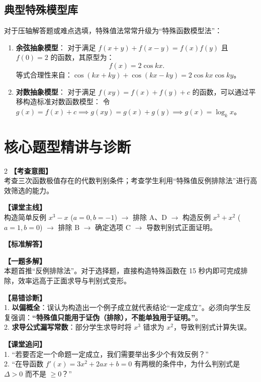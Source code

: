\documentclass[11pt,a4paper]{ctexart}
\begin{document}
\subsection{典型特殊模型库}
对于压轴解答题或难点选填，特殊值法常常升级为“特殊函数模型法”：
\begin{enumerate}[label=\arabic*. , leftmargin=2em, itemsep=1.2em, topsep=0.2em]
  \item \textbf{余弦抽象模型}：
  对于满足 \(f(x+y)+f(x-y)=f(x)f(y)\) 且 \(f(0)=2\) 的函数，其原型为：
  \[
  f(x) = 2\cos kx.
  \]
  等式合理性来自：\(\cos(kx+ky) + \cos(kx-ky) = 2\cos kx \cos ky\)。
  \item \textbf{对数抽象模型}：
  对于满足 \(f(xy) = f(x) + f(y) + c\) 的函数，可以通过平移构造标准对数函数模型：
  令 \(g(x) = f(x) + c \implies g(xy) = g(x) + g(y) \implies g(x) = \log_k x\)。
\end{enumerate}

\newpage

\section{核心题型精讲与诊断}

\qOneStem
\qOneOptions

\begin{paracol}{2}
  \textbf{【考查意图】}\\
  考查三次函数极值存在的代数判别条件；考查学生利用“特殊值反例排除法”进行高效筛选的能力。
  
  \textbf{【课堂主线】}\\
  构造简单反例 \(x^3-x\) (\(a=0,b=-1\)) \(\to\) 排除 A、D \(\to\) 构造反例 \(x^3+x^2\) (\(a=1,b=0\)) \(\to\) 排除 B \(\to\) 确定选项 C \(\to\) 导数判别式正面证明。
  
  \textbf{【标准解答】}\\
  \qOneSolution
  
  \textbf{【一题多解】}\\
  本题首推“反例排除法”。对于选择题，直接构造特殊函数在 15 秒内即可完成排除，效率远高于正面求导与判别式变形。

  \switchcolumn
  \textbf{【易错诊断】}\\
  1. \textbf{以偏概全}：误认为构造出一个例子成立就代表结论“一定成立”。必须向学生反复强调：\textbf{“特殊值只能用于证伪（排除），不能单独用于证明。”}。\\
  2. \textbf{求导公式漏写常数}：部分学生求导时将 \(x^3\) 错求为 \(x^2\)，导致判别式计算失误。
  
  \textbf{【课堂追问】}\\
  1. “若要否定一个命题一定成立，我们需要举出多少个有效反例？”\\
  2. “在导函数 \(f'(x)=3x^2+2ax+b=0\) 有两根的条件中，为什么判别式是 \(\Delta > 0\) 而不是 \(\geqslant 0\)？”
\end{paracol}
\end{document}
